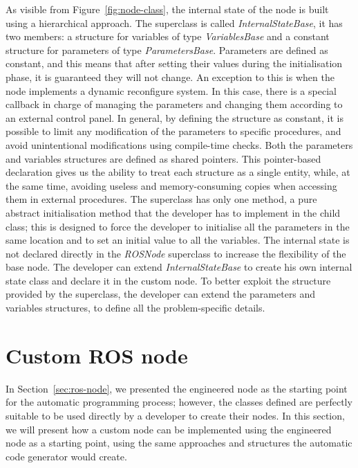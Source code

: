 As visible from Figure~\ref{fig:node-class}, the internal state of the node is built using a hierarchical approach. The superclass is called \textit{InternalStateBase}, it has two members: a structure for variables of type \textit{VariablesBase} and a constant structure for parameters of type  \textit{ParametersBase}. Parameters are defined as constant, and this means that after setting their values during the initialisation phase, it is guaranteed they will not change. An exception to this is when the node implements a dynamic reconfigure system. In this case, there is a special callback in charge of managing the parameters and changing them according to an external control panel. In general, by defining the structure as constant, it is possible to limit any modification of the parameters to specific procedures, and avoid unintentional modifications using compile-time checks. Both the parameters and variables structures are defined as shared pointers. This pointer-based declaration gives us the ability to treat each structure as a single entity, while, at the same time, avoiding useless and memory-consuming copies when accessing them in external procedures. The superclass has only one method, a pure abstract initialisation method that the developer has to implement in the child class; this is designed to force the developer to initialise all the parameters in the same location and to set an initial value to all the variables. The internal state is not declared directly in the \textit{ROSNode} superclass to increase the flexibility of the base node. The developer can extend \textit{InternalStateBase} to create his own internal state class and declare it in the custom node. To better exploit the structure provided by the superclass, the developer can extend the parameters and variables structures, to define all the problem-specific details.

\section{Custom ROS node}
In Section~\ref{sec:ros-node}, we presented the engineered node as the starting point for the automatic programming process; however, the classes defined are perfectly suitable to be used directly by a developer to create their nodes. In this section, we will present how a custom node can be implemented using the engineered node as a starting point, using the same approaches and structures the automatic code generator would create.

